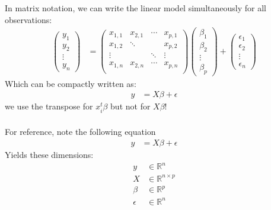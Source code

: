 \begin{frame}[fragile] \frametitle{}

In matrix notation, we can write the linear model simultaneously
for all observations:
\begin{align*}
\left(\begin{array}{c}y_1\\ y_2\\ \vdots\\ y_n\end{array}\right) &=
  \left(\begin{array}{cccc}x_{1,1}&x_{2,1}&\cdots&x_{p,1}\\
                           x_{1,2}&\ddots&&x_{p,2}\\
                           \vdots&&\ddots&\vdots\\
                           x_{1,n}&x_{2,n}&\cdots&x_{p,n}\\\end{array}\right)
  \left(\begin{array}{c}\beta_1\\ \beta_2\\ \vdots\\ \beta_p\end{array}\right) +
  \left(\begin{array}{c}\epsilon_1\\ \epsilon_2\\ \vdots\\ \epsilon_n\end{array}\right)
\end{align*}
\pause Which can be compactly written as:
\begin{align*}
y &= X \beta + \epsilon
\end{align*}
 we use the transpose for $x_i^t \beta$ but not for $X \beta$!

\end{frame}

\begin{frame}[fragile] \frametitle{}

For reference, note the following equation
\begin{align*}
y &= X \beta + \epsilon
\end{align*}
Yields these dimensions:
\begin{align*}
y &\in \mathbb{R}^n \\
X &\in \mathbb{R}^{n \times p} \\
\beta &\in \mathbb{R}^p \\
\epsilon &\in \mathbb{R}^n \\
\end{align*}

\end{frame}

